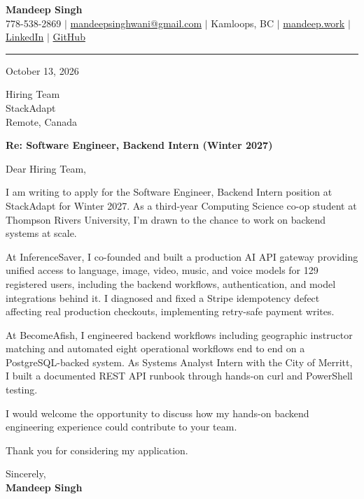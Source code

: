 \documentclass[letterpaper,11pt]{article}
\begin{document}
\begin{center}
    \textbf{\LARGE Mandeep Singh} \\ \vspace{2pt}
    \small 778-538-2869 $|$
    \href{mailto:mandeepsinghwani@gmail.com}{mandeepsinghwani@gmail.com} $|$
    Kamloops, BC $|$
    \href{https://mandeep.work}{mandeep.work} $|$
    \href{https://www.linkedin.com/in/mandeep-singh-b855972a7/}{LinkedIn} $|$
    \href{https://github.com/deepmroot}{GitHub}
\end{center}

\vspace{4pt}
\hrule
\vspace{14pt}

October 13, 2026

\vspace{8pt}
Hiring Team \\
StackAdapt \\
Remote, Canada

\vspace{8pt}
\textbf{Re: Software Engineer, Backend Intern (Winter 2027)}

\vspace{10pt}
Dear Hiring Team,

\vspace{4pt}
I am writing to apply for the Software Engineer, Backend Intern position at StackAdapt for Winter 2027. As a third-year Computing Science co-op student at Thompson Rivers University, I'm drawn to the chance to work on backend systems at scale.

At InferenceSaver, I co-founded and built a production AI API gateway providing unified access to language, image, video, music, and voice models for 129 registered users, including the backend workflows, authentication, and model integrations behind it. I diagnosed and fixed a Stripe idempotency defect affecting real production checkouts, implementing retry-safe payment writes.

At BecomeAfish, I engineered backend workflows including geographic instructor matching and automated eight operational workflows end to end on a PostgreSQL-backed system. As Systems Analyst Intern with the City of Merritt, I built a documented REST API runbook through hands-on curl and PowerShell testing.

I would welcome the opportunity to discuss how my hands-on backend engineering experience could contribute to your team.

Thank you for considering my application.

\vspace{16pt}
Sincerely, \\
\vspace{6pt}
\textbf{Mandeep Singh}
\end{document}
